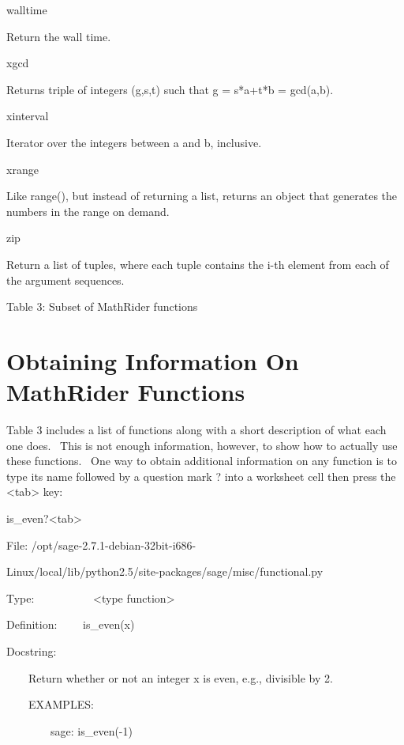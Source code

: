 \documentclass[12pt,twoside]{book}
\begin{document}
walltime

Return the wall time.

xgcd

Returns triple of integers (g,s,t) such that g = s*a+t*b = gcd(a,b).

xinterval

Iterator over the integers between a and b, inclusive.

xrange

Like range(), but instead of returning a list, returns an object that
generates the numbers in the range on demand.

zip

Return a list of tuples, where each tuple contains the i{}-th element
from each of the argument sequences.

Table 3: Subset of MathRider functions

\section[Obtaining Information On MathRider Functions]{Obtaining Information On MathRider Functions}
Table 3 includes a list of functions along with a short description of
what each one does. \ This is not enough information, however, to show
how to actually use these functions. \ One way to obtain additional
information on any function is to type its name followed by a question
mark {\textquotesingle}?{\textquotesingle} into a worksheet cell then
press the {\textless}tab{\textgreater} key:


\bigskip

is\_even?{\textless}tab{\textgreater}

{\textbar}

File: /opt/sage{}-2.7.1{}-debian{}-32bit{}-i686{}-      

Linux/local/lib/python2.5/site{}-packages/sage/misc/functional.py  

Type: \ \ \ \ \ \ \ \ \ \ {\textless}type
{\textquotesingle}function{\textquotesingle}{\textgreater}        

Definition: \ \ \ \ is\_even(x)         

Docstring:            

              

\ \ \ \ Return whether or not an integer x is even, e.g., divisible by
2.

              

\ \ \ \ EXAMPLES:            

\ \ \ \ \ \ \ \ sage: is\_even({}-1)         
\end{document}
